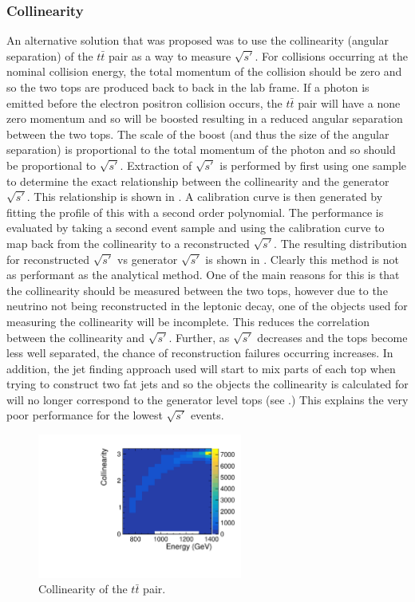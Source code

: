\subsubsection{Collinearity}

An alternative solution that was proposed was to use the collinearity (angular separation) of the $t\bar{t}$ pair as a way to measure $\sqrt{s'}$. For collisions occurring at the nominal collision energy, the total momentum of the collision should be zero and so the two tops are produced back to back in the lab frame. If a photon is emitted before the electron positron collision occurs, the $t\bar{t}$ pair will have a none zero momentum and so will be boosted resulting in a reduced angular separation between the two tops. The scale of the boost (and thus the size of the angular separation) is proportional to the total momentum of the photon and so should be proportional to $\sqrt{s'}$. Extraction of $\sqrt{s'}$ is performed by first using one sample to determine the exact relationship between the collinearity and the generator $\sqrt{s'}$. This relationship is shown in . A calibration curve is then generated by fitting the profile of this with a second order polynomial. The performance is evaluated by taking a second event sample and using the calibration curve to map back from the collinearity to a reconstructed $\sqrt{s'}$. The resulting distribution for reconstructed $\sqrt{s'}$ vs generator $\sqrt{s'}$ is shown in . Clearly this method is not as performant as the analytical method. One of the main reasons for this is that the collinearity should be measured between the two tops, however due to the neutrino not being reconstructed in the leptonic decay, one of the objects used for measuring the collinearity will be incomplete. This reduces the correlation between the collinearity and $\sqrt{s'}$. Further, as $\sqrt{s'}$ decreases and the tops become less well separated, the chance of reconstruction failures occurring increases. In addition, the jet finding approach used will start to mix parts of each top when trying to construct two fat jets and so the objects the collinearity is calculated for will no longer correspond to the generator level tops (see .) This explains the very poor performance for the lowest $\sqrt{s'}$ events.

\begin{figure}
  \centering
  \includegraphics[width=0.6\textwidth]{TopAnalysis/figures/ColVsE.pdf}
  \caption[Collinearity of $t\bar{t}$ pair]{Collinearity of the $t\bar{t}$ pair.}
  \label{fig:Collinearity}
\end{figure}

